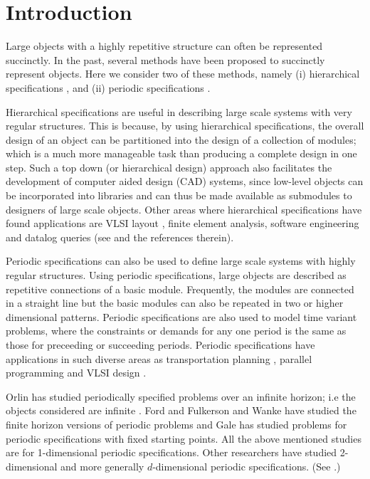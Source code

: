 \section{Introduction}
\label{sec:intro}

Large objects with a highly repetitive structure can often be represented
succinctly.
In the past, several methods have been proposed to succinctly 
represent objects.
Here we consider two of these methods, namely
(i) hierarchical specifications  \cite{Ga82,GW83,LW92,BOW83,RH93},
and (ii) periodic specifications 
\cite{CM91,HW92,IS87,KO91,KS88,Or82a,Wa93}.
 


Hierarchical specifications are useful in describing large scale systems with
very regular structures. This is because, 
by using hierarchical specifications, the overall design of an object can be 
partitioned into the design of a collection of modules;
which is a 
much more manageable task than producing a complete design in one step.
Such a top down (or hierarchical design) approach 
also facilitates the development of computer aided design (CAD) systems, since
low-level objects can be  incorporated into libraries and can thus be made
available as submodules to designers of large scale  objects.
Other areas where hierarchical specifications have found applications are
VLSI layout \cite{HLW92,HW92,RH93},  
finite element analysis, software engineering and datalog queries 
(see \cite{HLW92,Ma94} and the references therein). 






Periodic specifications
can also be used to define large scale systems with highly regular structures.
Using  periodic specifications, 
large objects are  described as repetitive connections of a basic module.
Frequently, the modules are connected in a straight line 
but the basic modules can also  be repeated in two or higher
dimensional patterns. Periodic specifications are also used to 
model time variant  problems,  where the constraints
or demands  for any one period is the same as those for preceeding or 
succeeding periods. 
 Periodic specifications 
have applications in such diverse areas  as  transportation planning
\cite{Or82a,HLW92,Ma94},
parallel programming \cite{HLW92,KMW67} and 
VLSI design \cite{IS87,IS88}.

Orlin has studied periodically specified problems over an infinite 
horizon; i.e the objects considered are infinite \cite{Or82a}. 
Ford and Fulkerson \cite{FF58} and Wanke \cite{Wa93} have 
studied the finite horizon
versions of periodic problems and Gale \cite{Ga59} has studied problems for
periodic specifications with fixed starting points. All the above mentioned
studies are for 1-dimensional periodic specifications.
Other 
researchers have studied 2-dimensional and more generally $d$-dimensional
periodic specifications. (See  \cite{CM91,IS87,KO91,KS88,Wa93}.) 

